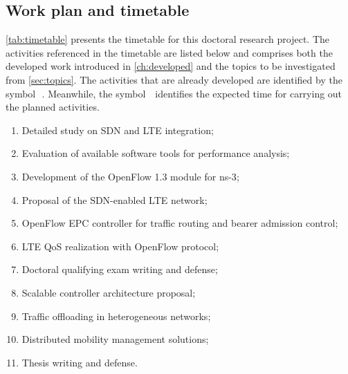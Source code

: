 \subsection{Work plan and timetable}
\label{sec:timetable}

\autoref{tab:timetable} presents the timetable for this doctoral research
project. The activities referenced in the timetable are listed below and
comprises both the developed work introduced in \autoref{ch:developed} and the
topics to be investigated from \autoref{sec:topics}. The activities that are
already developed are identified by the symbol~\,\m. Meanwhile, the symbol
\,\x\, identifies the expected time for carrying out the planned activities.

\begin{enumerate}
	\itemsep0pt
  \item Detailed study on \ac{SDN} and \ac{LTE} integration;
  \item Evaluation of available software tools for performance analysis;
  \item Development of the OpenFlow 1.3 module for \ac{ns-3};
  \item Proposal of the \ac{SDN}-enabled \ac{LTE} network;
  \item OpenFlow \ac{EPC} controller for traffic routing and bearer admission
        control;
  \item \ac{LTE} \ac{QoS} realization with OpenFlow protocol;
  \item Doctoral qualifying exam writing and defense;
  \item Scalable controller architecture proposal;
  \item Traffic offloading in heterogeneous networks;
  \item Distributed mobility management solutions;
  \item Thesis writing and defense.
\end{enumerate}

